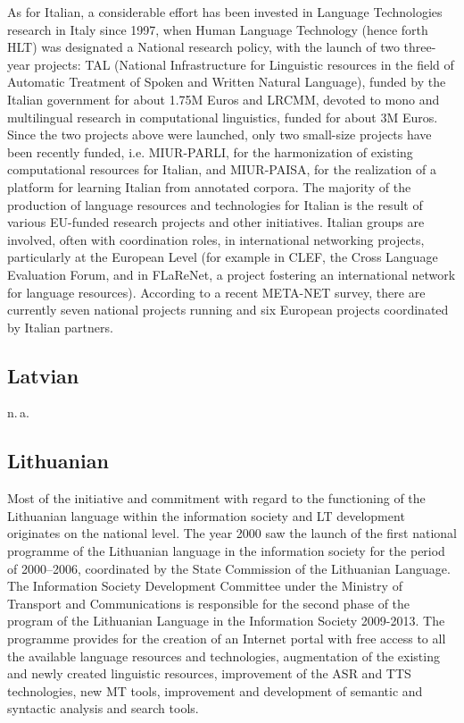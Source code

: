 \documentclass[10pt, plain]{../../metanetpaper}
\begin{document}
\begin{multicols}{2}
As for Italian, a considerable effort has been invested in Language Technologies research in Italy since 1997, when Human Language Technology (hence forth HLT) was designated a National research policy, with the launch of two three-year projects: TAL (National Infrastructure for Linguistic resources in the field of Automatic Treatment of Spoken and Written Natural Language), funded by the Italian government for about 1.75M Euros and LRCMM, devoted to mono and multilingual research in computational linguistics, funded for about 3M Euros. Since the two projects above were launched, only two small-size projects have been recently funded, i.e. MIUR-PARLI, for the harmonization of existing computational resources for Italian, and MIUR-PAISA, for the realization of a platform for learning Italian from annotated corpora. The majority of the production of language resources and technologies for Italian is the result of various EU-funded research projects and other initiatives. Italian groups are involved, often with coordination roles, in international networking projects, particularly at the European Level (for example in CLEF, the Cross Language Evaluation Forum, and in FLaReNet, a project fostering an international network for language resources). According to a recent META-NET survey, there are currently seven national projects running and six European projects coordinated by Italian partners.

\subsection*{Latvian}
\label{sec:latvian}

n.\,a.

\subsection*{Lithuanian}
\label{sec:lithuanian}

Most of the initiative and commitment with regard to the functioning of the Lithuanian language within the information society and LT development originates on the national level. The year 2000 saw the launch of the first national programme of the Lithuanian language in the information society for the period of 2000–2006, coordinated by the State Commission of the Lithuanian Language. The Information Society Development Committee under the Ministry of Transport and Communications is responsible for the second phase of the program of the Lithuanian Language in the Information Society 2009-2013. The programme provides for the creation of an Internet portal with free access to all the available language resources and technologies, augmentation of the existing and newly created linguistic resources, improvement of the ASR and TTS technologies, new MT tools, improvement and development of semantic and syntactic analysis and search tools.


\end{multicols}
\end{document}
